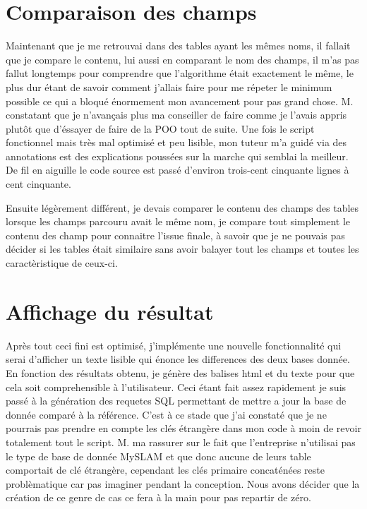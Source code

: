 \section{Comparaison des champs}

Maintenant que je me retrouvai dans des tables ayant les mêmes noms, il fallait
que je compare le contenu, lui aussi en comparant le nom des champs, il m'as
pas fallut longtemps pour comprendre que l'algorithme était exactement le même,
le plus dur étant de savoir comment j'allais faire pour me répeter le minimum
possible ce qui a bloqué énormement mon avancement pour pas grand chose.
M. constatant que je n'avançais plus ma conseiller de faire comme
je l'avais appris plutôt que d'éssayer de faire de la POO tout de suite. Une
fois le script fonctionnel mais très mal optimisé et peu lisible, mon tuteur
m'a guidé via des annotations est des explications poussées sur la marche qui
semblai la meilleur. De fil en aiguille le code source est passé d'environ
trois-cent cinquante lignes à cent cinquante.

Ensuite légèrement différent, je devais comparer le contenu des champs des
tables lorsque les champs parcouru avait le même nom, je compare tout
simplement le contenu des champ pour connaitre l'issue finale, à savoir que je
ne pouvais pas décider si les tables était similaire sans avoir balayer tout
les champs et toutes les caractèristique de ceux-ci.

\section{Affichage du résultat}

Après tout ceci fini est optimisé, j'implémente une nouvelle fonctionnalité qui
serai d'afficher un texte lisible qui énonce les differences des deux bases
donnée. En fonction des résultats obtenu, je génère des balises html et du
texte pour que cela soit comprehensible à l'utilisateur. Ceci étant fait assez
rapidement je suis passé à la génération des requetes SQL permettant de mettre
a jour la base de donnée comparé à la référence. C'est à ce stade que j'ai
constaté que je ne pourrais pas prendre en compte les clés étrangère dans mon
code à moin de revoir totalement tout le script.  M. ma rassurer sur le
fait que l'entreprise n'utilisai pas le type de base de donnée MySLAM et que
donc aucune de leurs table comportait de clé étrangère, cependant les clés
primaire concaténées reste problèmatique car pas imaginer pendant la
conception. Nous avons décider que la création de ce genre de cas ce fera à la
main pour pas repartir de zéro.

